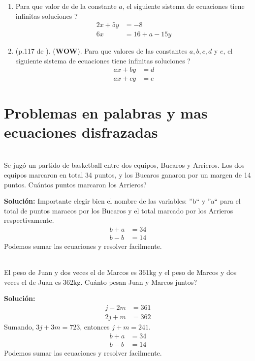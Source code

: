 \begin{enumerate}
	\item Para que valor de de la constante $a$, el siguiente sistema de ecuaciones tiene infinitas soluciones ?
	\begin{align*}
	2x + 5y&= -8\\
	6x &= 16 + a - 15y
	\end{align*}
	
	\item (p.117 de \cite{Aops_algebra}). (\textbf{WOW}). Para que valores de las constantes $a,b,c,d$ y $e$, el siguiente sistema de ecuaciones tiene infinitas soluciones ?
	\begin{align*}
	ax+by&=d\\
	ax+cy&=e
	\end{align*}
\end{enumerate}
\newpage


\section{Problemas en palabras y mas ecuaciones disfrazadas}\label{section:problemasEnPalabrasyEcuacionesDisfrazadas}

\begin{ejemplo}{\ \\}
	Se jugó un partido de basketball entre dos equipos, Bucaros y Arrieros. Los dos equipos marcaron en total 34 puntos, y los Bucaros ganaron por un margen de 14 puntos. Cuántos puntos marcaron los Arrieros?
	
	\textbf{Solución: }Importante elegir bien el nombre de las variables: ''b`` y ''a`` para el total de puntos maracos por los Bucaros y el total marcado por los Arrieros respectivamente. 
	\begin{align*}
	b + a&= 34\\
	b-b &= 14
	\end{align*}
	Podemos sumar las ecuaciones y resolver facilmente.
\end{ejemplo}

\begin{ejemplo}{\ \\}
	El peso de Juan y dos veces el de Marcos es 361kg y el peso de Marcos y dos veces el de Juan es 362kg. Cuánto pesan Juan y Marcos juntos?
	
	\textbf{Solución: }
	\begin{align*}
	j + 2m&= 361\\
	2j+m &= 362
	\end{align*}
	Sumando, $3j+3m=723$, entonces $j+m=241$.
	\begin{align*}
	b + a&= 34\\
	b-b &= 14
	\end{align*}
	Podemos sumar las ecuaciones y resolver facilmente.
\end{ejemplo}


